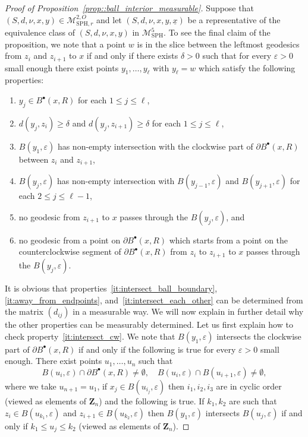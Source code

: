\documentclass[JEP,XML,SOM,Unicode]{cedram}
\let\mathcal\mathscr
\newcommand{\sbullet}{{\scriptscriptstyle\bullet}}
\let\epsilon\varepsilon
\theoremstyle{plain}
\numberwithin{theorem}{section}
\theoremstyle{definition}
\newcommand\gmsspace{{\mathcal M}_{\mathrm{SPH}}}
\newcommand\gmsspacer{{\mathcal M}_{\mathrm{SPH},r}}
\newcommand{\Z}{\mathbf{Z}}
\let\ul\underline
\newcommand{\fb}[2]{B^\sbullet(#1,#2)}
\begin{document}
\begin{proof}[Proof of Proposition~\ref{prop::ball_interior_measurable}]
Suppose that $(S,d,\nu,x,y) \in \gmsspacer^{2,O}$ and let $(S,d,\nu,x,y,\ul{x})$ be a representative of the equivalence class of $(S,d,\nu,x,y)$ in $\gmsspace^5$. To see the final claim of the proposition, we note that a point $w$ is in the slice between the leftmost geodesics from $z_i$ and $z_{i+1}$ to $x$ if and only if there exists $\delta > 0$ such that for every $\epsilon > 0$ small enough there exist points $y_1,\ldots,y_\ell$ with $y_\ell = w$ which satisfy the following properties:
\begin{enumerate}
\item\label{it:intersect_ball_boundary} $y_j \in \fb{x}{R}$ for each $1 \leq j \leq \ell$,
\item\label{it:away_from_endpoints} $d(y_j,z_i) \geq \delta$ and $d(y_j,z_{i+1}) \geq \delta$ for each $1 \leq j \leq \ell$,
\item\label{it:intersect_cw} $B(y_1,\epsilon)$ has non-empty intersection with the clockwise part of $\partial \fb{x}{R}$ between $z_i$ and $z_{i+1}$,
\item\label{it:intersect_each_other} $B(y_j,\epsilon)$ has non-empty intersection with $B(y_{j-1},\epsilon)$ and $B(y_{j+1},\epsilon)$ for each $2 \leq j \leq \ell-1$,
\item\label{it::no_geodesic_i_plus_1} no geodesic from $z_{i+1}$ to $x$ passes through the $B(y_j,\epsilon)$, and
\item\label{it::no_geodesic_i} no geodesic from a point on $\partial \fb{x}{R}$ which starts from a point on the counterclockwise segment of $\partial \fb{x}{R}$ from $z_i$ to $z_{i+1}$ to $x$ passes through the $B(y_j,\epsilon)$.
\end{enumerate}
It is obvious that properties~\ref{it:intersect_ball_boundary}, \ref{it:away_from_endpoints}, and~\ref{it:intersect_each_other} can be determined from the matrix $(d_{ij})$ in a measurable way. We will now explain in further detail why the other properties can be measurably determined. Let us first explain how to check property~\ref{it:intersect_cw}. We note that $B(y_1,\epsilon)$ intersects the clockwise part of $\partial \fb{x}{R}$ if and only if the following is true for every $\epsilon > 0$ small enough. There exist points $u_1,\ldots,u_n$ such that
\[
B(u_i,\epsilon) \cap \partial \fb{x}{R} \neq \emptyset,\quad B(u_i,\epsilon) \cap B(u_{i+1},\epsilon) \neq \emptyset,
\]
where we take $u_{n+1} = u_1$, if $x_j \in B(u_{i_j},\epsilon)$ then $i_1,i_2,i_3$ are in cyclic order (viewed as elements of $\Z_n$) and the following is true. If $k_1,k_2$ are such that $z_i \in B(u_{k_1},\epsilon)$ and $z_{i+1} \in B(u_{k_2},\epsilon)$ then $B(y_1,\epsilon)$ intersects $B(u_j,\epsilon)$ if and only if $k_1 \leq u_j \leq k_2$ (viewed as elements of $\Z_n$).

\end{proof}
\end{document}

